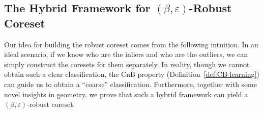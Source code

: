 \documentclass{article}
\begin{document}
\subsection{The Hybrid Framework for $ (\beta,\varepsilon) $-Robust Coreset}\label{sec:robust-coreset}
Our idea for building the robust coreset comes from the following intuition. In an ideal scenario, if we know who are the inliers and who are the outliers, we can simply construct the coresets for them separately. In reality, though we cannot obtain such a clear classification, the CnB property (Definition~\ref{def:CB-learning}) can guide us to obtain a ``coarse'' classification. Furthermore, together with some novel insights in geometry, we prove that such a hybrid framework can yield a $ (\beta,\varepsilon) $-robust coreset. 
\end{document}
